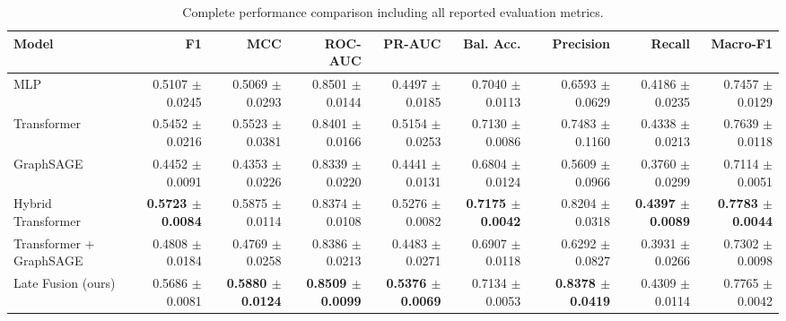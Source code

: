 \begin{table}[t]
\centering
\scriptsize
\caption{Complete performance comparison including all reported evaluation metrics.}
\label{tab:supplementary-all-models}
\begin{tabular}{lrrrrrrrr}
\toprule
Model & F1 & MCC & ROC-AUC & PR-AUC & Bal. Acc. & Precision & Recall & Macro-F1 \\
\midrule
MLP & 0.5107 $\pm$ 0.0245 & 0.5069 $\pm$ 0.0293 & 0.8501 $\pm$ 0.0144 & 0.4497 $\pm$ 0.0185 & 0.7040 $\pm$ 0.0113 & 0.6593 $\pm$ 0.0629 & 0.4186 $\pm$ 0.0235 & 0.7457 $\pm$ 0.0129 \\
Transformer & 0.5452 $\pm$ 0.0216 & 0.5523 $\pm$ 0.0381 & 0.8401 $\pm$ 0.0166 & 0.5154 $\pm$ 0.0253 & 0.7130 $\pm$ 0.0086 & 0.7483 $\pm$ 0.1160 & 0.4338 $\pm$ 0.0213 & 0.7639 $\pm$ 0.0118 \\
GraphSAGE & 0.4452 $\pm$ 0.0091 & 0.4353 $\pm$ 0.0226 & 0.8339 $\pm$ 0.0220 & 0.4441 $\pm$ 0.0131 & 0.6804 $\pm$ 0.0124 & 0.5609 $\pm$ 0.0966 & 0.3760 $\pm$ 0.0299 & 0.7114 $\pm$ 0.0051 \\
Hybrid Transformer & \textbf{0.5723 $\pm$ 0.0084} & 0.5875 $\pm$ 0.0114 & 0.8374 $\pm$ 0.0108 & 0.5276 $\pm$ 0.0082 & \textbf{0.7175 $\pm$ 0.0042} & 0.8204 $\pm$ 0.0318 & \textbf{0.4397 $\pm$ 0.0089} & \textbf{0.7783 $\pm$ 0.0044} \\
Transformer + GraphSAGE & 0.4808 $\pm$ 0.0184 & 0.4769 $\pm$ 0.0258 & 0.8386 $\pm$ 0.0213 & 0.4483 $\pm$ 0.0271 & 0.6907 $\pm$ 0.0118 & 0.6292 $\pm$ 0.0827 & 0.3931 $\pm$ 0.0266 & 0.7302 $\pm$ 0.0098 \\
Late Fusion (ours) & 0.5686 $\pm$ 0.0081 & \textbf{0.5880 $\pm$ 0.0124} & \textbf{0.8509 $\pm$ 0.0099} & \textbf{0.5376 $\pm$ 0.0069} & 0.7134 $\pm$ 0.0053 & \textbf{0.8378 $\pm$ 0.0419} & 0.4309 $\pm$ 0.0114 & 0.7765 $\pm$ 0.0042 \\
\bottomrule
\end{tabular}
\end{table}
